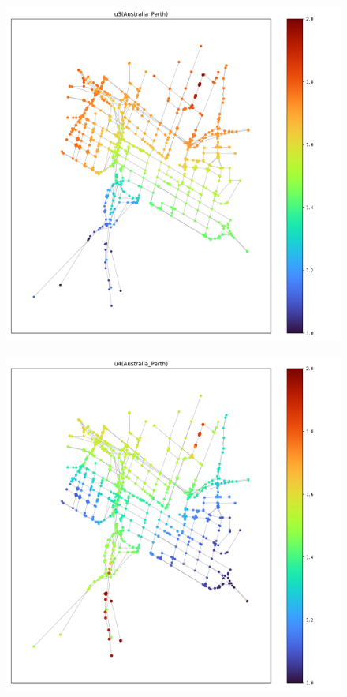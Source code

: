 \documentclass[dvipdfmx]{jsarticle}
\begin{document}
\begin{figure}[h]
  \centering
  \includegraphics[width=\linewidth]{fig/u3_Australia_Perth.png}
\end{figure}
\begin{figure}[h]
  \centering
  \includegraphics[width=\linewidth]{fig/u4_Australia_Perth.png}
\end{figure}
\end{document}
